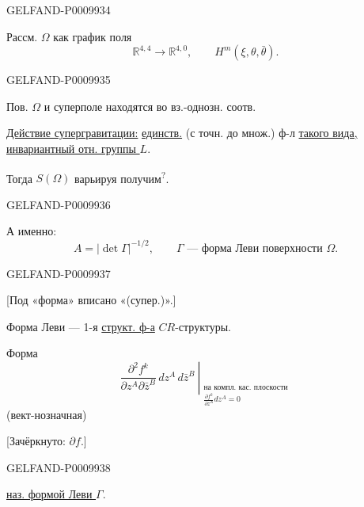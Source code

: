 \begin{GelfandAdjacentEvidence}{GELFAND-P000993}{4}


Рассм. $\Omega$ как график поля
\[
\mathbb R^{4,4}\longrightarrow\mathbb R^{4,0},\qquad
H^m(\xi,\theta,\bar\theta).
\]
\end{GelfandAdjacentEvidence}
\begin{GelfandAdjacentEvidence}{GELFAND-P000993}{5}


Пов. $\Omega$ и суперполе находятся во вз.-однозн. соотв.

\underline{Действие супергравитации:} \underline{единств.} (с точн. до множ.) ф-л \underline{такого вида, инвариантный отн. группы $L$}.

Тогда $S(\Omega)$ варьируя получим\textsuperscript{?}.
\end{GelfandAdjacentEvidence}
\begin{GelfandAdjacentEvidence}{GELFAND-P000993}{6}


А именно:
\[
A=|\det\Gamma|^{-1/2},\qquad
\Gamma\text{ --- форма Леви поверхности }\Omega.
\]
\end{GelfandAdjacentEvidence}
\begin{GelfandAdjacentEvidence}{GELFAND-P000993}{7}


[Под «форма» вписано «(супер.)».]

Форма Леви --- 1-я \underline{структ. ф-а} $CR$-структуры.

Форма
\[
\left.
\frac{\partial^2 f^k}{\partial z^A\partial\bar z^B}\,
dz^A\,d\bar z^B
\ \right|_{\substack{\text{на компл. кас. плоскости}\\
 \frac{\partial f^k}{\partial z^A}dz^A=0}}
\]
(вект-нозначная)

[Зачёркнуто: $\partial f$.]
\end{GelfandAdjacentEvidence}
\begin{GelfandAdjacentEvidence}{GELFAND-P000993}{8}


\underline{наз. формой Леви $\Gamma$}.

\end{GelfandAdjacentEvidence}


